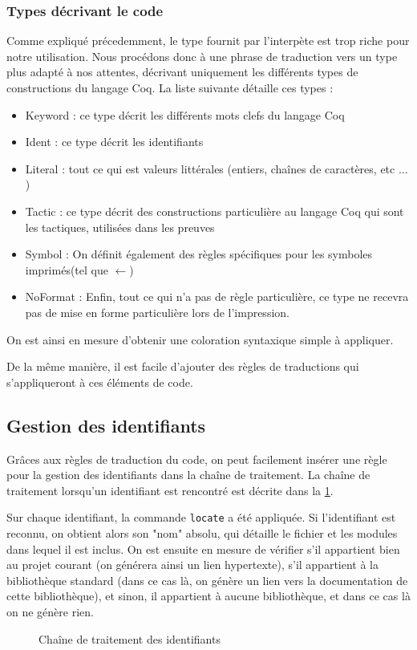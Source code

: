 \documentclass[a4paper, 11pt]{report}
\begin{document}
    \subsubsection{Types décrivant le code}
    Comme expliqué précedemment, le type fournit par l'interpète est trop riche
    pour notre utilisation. Nous procédons donc à une phrase de traduction vers
    un type plus adapté à nos attentes, décrivant uniquement les différents types
    de constructions du langage Coq. La liste suivante détaille ces types :
    \begin{itemize}
      \item Keyword : ce type décrit les différents mots clefs du langage Coq
      \item Ident : ce type décrit les identifiants
      \item Literal : tout ce qui est valeurs littérales (entiers, chaînes de
        caractères, etc $\ldots$)
      \item Tactic : ce type décrit des constructions particulière au langage
        Coq qui sont les tactiques, utilisées dans les preuves
      \item Symbol : On définit également des règles spécifiques pour les symboles
        imprimés(tel que $\leftarrow$)
      \item NoFormat : Enfin, tout ce qui n'a pas de règle particulière, ce type
        ne recevra pas de mise en forme particulière lors de l'impression.
    \end{itemize}
    On est ainsi en mesure d'obtenir une coloration syntaxique simple à
    appliquer.

    De la même manière, il est facile d'ajouter des règles de traductions
    qui s'appliqueront à ces éléments de code.

    \clearpage
    \subsection{Gestion des identifiants}
    Grâces aux règles de traduction du code, on peut facilement insérer une
    règle pour la gestion des identifiants dans la chaîne de traitement.
    La chaîne de traitement lorsqu'un identifiant est rencontré est décrite
    dans la \cref{id1}.

    Sur chaque identifiant, la commande \texttt{locate} a été appliquée. Si
    l'identifiant est reconnu, on obtient alors son "nom" absolu, qui détaille
    le fichier et les modules dans lequel il est inclus.
    On est ensuite en mesure de vérifier s'il appartient bien au projet courant
    (on générera ainsi un lien hypertexte), s'il appartient à la bibliothèque
    standard (dans ce cas là, on génère un lien vers la documentation de
    cette bibliothèque), et sinon, il appartient à aucune bibliothèque,
    et dans ce cas là on ne génère rien.
    \begin{figure}
      \caption{Chaîne de traitement des identifiants\label{id1}}
    \end{figure}
\end{document}
